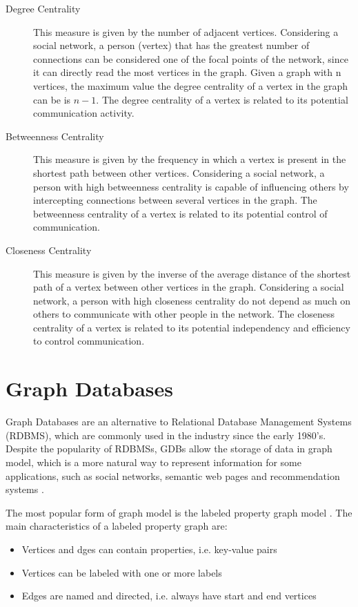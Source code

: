 \begin{description}
\item[Degree Centrality] This measure is given by the number of adjacent vertices. Considering a social network, a person (vertex) that has the greatest number of connections can be considered one of the focal points of the network, since it can directly read the most vertices in the graph. Given a graph with n vertices, the maximum value the degree centrality of a vertex in the graph can be is $n-1$. The degree centrality of a vertex is related to its potential communication activity.

\item[Betweenness Centrality] This measure is given by the frequency in which a vertex is present in the shortest path between other vertices. Considering a social network, a person with high betweenness centrality is capable of influencing others by intercepting connections between several vertices in the graph. The betweenness centrality of a vertex is related to its potential control of communication.

\item[Closeness Centrality] This measure is given by the inverse of the average distance of the shortest path of a vertex between other vertices in the graph. Considering a social network, a person with high closeness centrality do not depend as much on others to communicate with other people in the network. The closeness centrality of a vertex is related to its potential independency and efficiency to control communication.
\end{description}

\section{Graph Databases}

Graph Databases are an alternative to Relational Database Management Systems (RDBMS), which are commonly used in the industry since the early 1980's. Despite the popularity of RDBMSs, GDBs allow the storage of data in graph model, which is a more natural way to represent information for some applications, such as social networks, semantic web pages and recommendation systems \cite{Miller2013}. 

The most popular form of graph model is the labeled property graph model \cite{Robinson2015}. The main characteristics of a labeled property graph are:
\begin{itemize}
\item Vertices and dges can contain properties, i.e. key-value pairs
\item Vertices can be labeled with one or more labels
\item Edges are named and directed, i.e. always have start and end vertices
\end{itemize}

